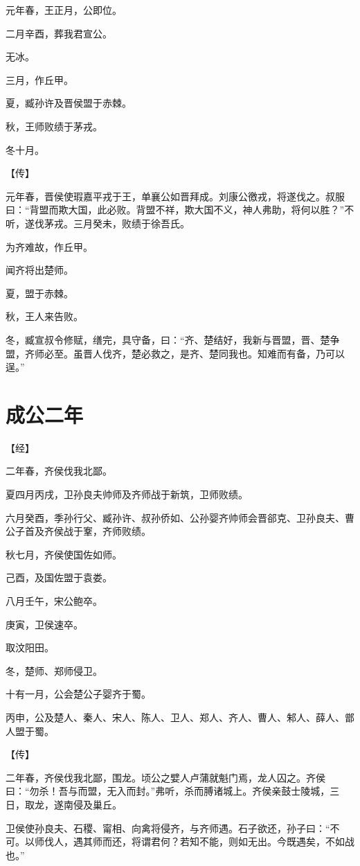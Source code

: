 \documentclass[a4paper,12pt,UTF8,twoside]{ctexbook}
\begin{document}
元年春，王正月，公即位。

二月辛酉，葬我君宣公。

无冰。

三月，作丘甲。

夏，臧孙许及晋侯盟于赤棘。

秋，王师败绩于茅戎。

冬十月。

【传】

元年春，晋侯使瑕嘉平戎于王，单襄公如晋拜成。刘康公徼戎，将遂伐之。叔服曰：“背盟而欺大国，此必败。背盟不祥，欺大国不义，神人弗助，将何以胜？”不听，遂伐茅戎。三月癸未，败绩于徐吾氏。

为齐难故，作丘甲。

闻齐将出楚师。

夏，盟于赤棘。

秋，王人来告败。

冬，臧宣叔令修赋，缮完，具守备，曰：“齐、楚结好，我新与晋盟，晋、楚争盟，齐师必至。虽晋人伐齐，楚必救之，是齐、楚同我也。知难而有备，乃可以逞。”

\section{成公二年}



【经】

二年春，齐侯伐我北鄙。

夏四月丙戌，卫孙良夫帅师及齐师战于新筑，卫师败绩。

六月癸酉，季孙行父、臧孙许、叔孙侨如、公孙婴齐帅师会晋郤克、卫孙良夫、曹公子首及齐侯战于鞌，齐师败绩。

秋七月，齐侯使国佐如师。

己酉，及国佐盟于袁娄。

八月壬午，宋公鲍卒。

庚寅，卫侯速卒。

取汶阳田。

冬，楚师、郑师侵卫。

十有一月，公会楚公子婴齐于蜀。

丙申，公及楚人、秦人、宋人、陈人、卫人、郑人、齐人、曹人、邾人、薛人、鄫人盟于蜀。

【传】

二年春，齐侯伐我北鄙，围龙。顷公之嬖人卢蒲就魁门焉，龙人囚之。齐侯曰：“勿杀！吾与而盟，无入而封。”弗听，杀而膊诸城上。齐侯亲鼓士陵城，三日，取龙，遂南侵及巢丘。

卫侯使孙良夫、石稷、甯相、向禽将侵齐，与齐师遇。石子欲还，孙子曰：“不可。以师伐人，遇其师而还，将谓君何？若知不能，则如无出。今既遇矣，不如战也。”
\end{document}
